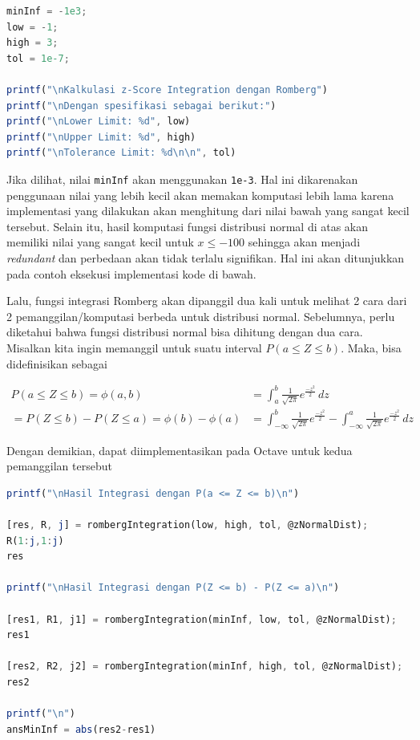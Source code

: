 \documentclass[journal,12pt,onecolumn,a4paper]{IEEEtran}
\begin{document}
\begin{center}
	\begin{lstlisting}[language=Octave]
minInf = -1e3;
low = -1;
high = 3;
tol = 1e-7;

printf("\nKalkulasi z-Score Integration dengan Romberg")
printf("\nDengan spesifikasi sebagai berikut:")
printf("\nLower Limit: %d", low)
printf("\nUpper Limit: %d", high)
printf("\nTolerance Limit: %d\n\n", tol)
	\end{lstlisting}
\end{center}

Jika dilihat, nilai \lstinline{minInf} akan menggunakan \lstinline{1e-3}. Hal ini dikarenakan penggunaan nilai yang lebih kecil akan memakan komputasi lebih lama karena implementasi yang dilakukan akan menghitung dari nilai bawah yang sangat kecil tersebut. Selain itu, hasil komputasi fungsi distribusi normal di atas akan memiliki nilai yang sangat kecil untuk \(x \le -100\) sehingga akan menjadi \emph{redundant} dan perbedaan akan tidak terlalu signifikan. Hal ini akan ditunjukkan pada contoh eksekusi implementasi kode di bawah.

Lalu, fungsi integrasi Romberg akan dipanggil dua kali untuk melihat 2 cara dari 2 pemanggilan/komputasi berbeda untuk distribusi normal. Sebelumnya, perlu diketahui bahwa fungsi distribusi normal bisa dihitung dengan dua cara. Misalkan kita ingin memanggil untuk suatu interval \(P(a \le Z \le b)\). Maka, bisa didefinisikan sebagai

\begin{equation*}
	\begin{split}
		P(a \le Z \le b )  = \phi(a,b) & = \int_{a}^{b} \frac{1}{\sqrt{2\pi}}e ^{\frac{-z^2}{2}} \,dz \\
		=  P(Z \le b ) - P(Z \le a )  = \phi(b)-\phi(a) & =  \int_{-\infty}^{b} \frac{1}{\sqrt{2\pi}}e ^{\frac{-z^2}{2}} - \int_{-\infty}^{a} \frac{1}{\sqrt{2\pi}}e ^{\frac{-z^2}{2}} \,dz
	\end{split}
\end{equation*}

Dengan demikian, dapat diimplementasikan pada Octave untuk kedua pemanggilan tersebut

\begin{center}
	\begin{lstlisting}[language=Octave]
printf("\nHasil Integrasi dengan P(a <= Z <= b)\n")

[res, R, j] = rombergIntegration(low, high, tol, @zNormalDist);
R(1:j,1:j)
res

printf("\nHasil Integrasi dengan P(Z <= b) - P(Z <= a)\n")

[res1, R1, j1] = rombergIntegration(minInf, low, tol, @zNormalDist);
res1

[res2, R2, j2] = rombergIntegration(minInf, high, tol, @zNormalDist);
res2

printf("\n")
ansMinInf = abs(res2-res1)
	\end{lstlisting}
\end{center}
\end{document}
